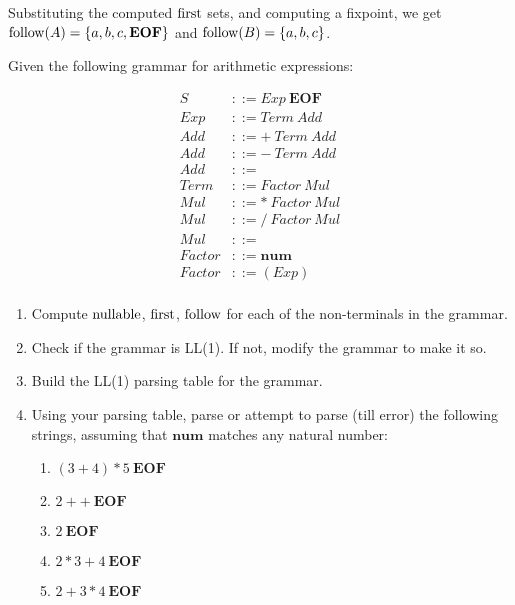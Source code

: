 \begin{exercise}{}
\begin{solution}
\begin{enumerate}
      Substituting the computed \(\operatorname{first}\) sets, and computing a fixpoint, we
      get \(\operatorname{follow}(A) = \{a, b, c,\mathbf{EOF}\}\) and \(\operatorname{follow}(B) = \{a, b,
      c\}\).
    \end{enumerate}
  \end{solution}
\end{exercise}

\begin{exercise}{}
  
  Given the following grammar for arithmetic expressions:

  \begin{align*}
    S &::= Exp~\mathbf{EOF} \\
    Exp &::= Term~ Add \\
    Add &::= +~ Term~ Add \\
    Add &::= -~ Term~ Add \\
    Add &::= \\
    Term &::= Factor~ Mul \\
    Mul &::= *~ Factor~ Mul \\
    Mul &::= /~ Factor~ Mul \\
    Mul &::= \\
    Factor &::= \mathbf{num} \\
    Factor &::= (Exp) \\
  \end{align*}

  \begin{enumerate}
    \item Compute \(\operatorname{nullable}\), \(\operatorname{first}\), \(\operatorname{follow}\) for each of the
    non-terminals in the grammar.
    \item Check if the grammar is LL(1). If not, modify the grammar to make it
    so.
    \item Build the LL(1) parsing table for the grammar.
    \item Using your parsing table, parse or attempt to parse (till error) the
    following strings, assuming that \(\mathbf{num}\) matches any natural
    number:
    \begin{enumerate}
      \item \((3 + 4) * 5 ~\mathbf{EOF}\)
      \item \(2 + + ~\mathbf{EOF}\)
      \item \(2 ~\mathbf{EOF}\)
      \item \(2 * 3 + 4 ~\mathbf{EOF}\)
      \item \(2 + 3 * 4 ~\mathbf{EOF}\)
    \end{enumerate}
  \end{enumerate}


\end{exercise}
